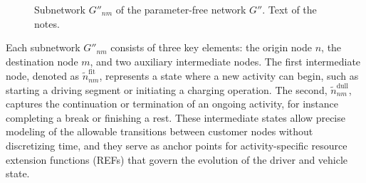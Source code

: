 \documentclass[trsc,dblanonrev]{informs4}
\begin{document}
\begin{figure}
\FIGURE
{}
{Subnetwork \(G''_{nm}\) of the parameter-free network \(G''\). \label{fig:subnetwork_nm}}
{Text of the notes.}
\end{figure}

Each subnetwork \( G''_{nm} \) consists of three key elements: the origin node \( n \), the destination node \( m \), and two auxiliary intermediate nodes. The first intermediate node, denoted as \( \tilde{n}^{\text{fit}}_{nm} \), represents a state where a new activity can begin, such as starting a driving segment or initiating a charging operation. The second, \( \tilde{n}^{\text{dull}}_{nm} \), captures the continuation or termination of an ongoing activity, for instance completing a break or finishing a rest. These intermediate states allow precise modeling of the allowable transitions between customer nodes without discretizing time, and they serve as anchor points for activity-specific resource extension functions (REFs) that govern the evolution of the driver and vehicle state.
\end{document}
